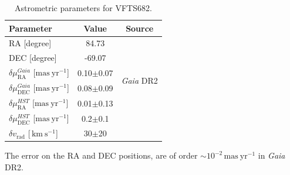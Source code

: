\documentclass[apjl,twocolumn]{emulateapj}
\newcommand{\kms}{{\,\mathrm{km\ s^{-1}}}}
\DeclareRobustCommand{\Secref}[1]{Sec.~\ref{#1}}
\begin{document}
\begin{table}
  \begin{center}
    \caption{Astrometric parameters for VFTS682. }
    \begin{tabular}{l|c|c}
      \hline
      \hline
      Parameter & Value & Source\\
      \hline
      RA \hfill[degree] &  \phantom{-}84.73 %
                        & \multirow{2}{*}{\cite{evans:11}}\\[5pt]
      DEC \hfill [degree] & -69.07 %
                        & \\[5pt]
      \hline
      $\delta\mu_\mathrm{RA}^{Gaia}$  \hfill[$\mathrm{mas\ yr^{-1}}$] & 0.10$\pm$0.07 & \multirow{2}{*}{\emph{Gaia} DR2}\\[5pt]
      $\delta\mu_\mathrm{DEC}^{Gaia}$  \hfill[$\mathrm{mas\ yr^{-1}}$] & 0.08$\pm$0.09 & \\[5pt]
      \hline
      $\delta\mu_\mathrm{RA}^{HST}$  \hfill[$\mathrm{mas\ yr^{-1}}$] & 0.01$\pm$0.13 & \multirow{2}{*}{\cite{platais:18}}\\[5pt]
      $\delta\mu_\mathrm{DEC}^{HST}$  \hfill[$\mathrm{mas\ yr^{-1}}$] &
                                                                        0.2$\pm$0.1 &
      \\[5pt]
      \hline
      $\delta v_\mathrm{rad}$  \hfill[$\kms$] & 30$\pm$20 & \cite{bestenlehner:11}\\
      \hline
    \end{tabular}
    \tablecomments
    {The error on the RA and DEC positions, are of order
      $\sim$$10^{-2}\,\mathrm{mas\ yr^{-1}}$ in \emph{Gaia}
      DR2. %
    }
  \end{center}
  \label{tab:vfts682}
\end{table}
\end{document}
